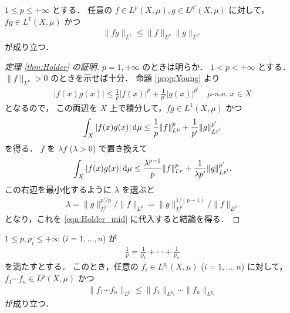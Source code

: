 \begin{theorem}\label{thm:Holder}
    $1\le p\le+\infty$ とする．
    任意の $f\in L^p(X,\mu),g\in L^{p'}(X,\mu)$ に対して，$fg\in L^1(X,\mu)$ かつ
    \begin{align*}
        \|fg\|_{L^1}\le\|f\|_{L^p}\|g\|_{L^{p'}}
    \end{align*}
    が成り立つ．
\end{theorem}

\begin{proof}[定理 \ref{thm:Holder} の証明]
    $p=1,+\infty$ のときは明らか．
    $1<p<+\infty$ とする．
    $\|f\|_{L^p}>0$ のときを示せば十分．
    命題 \ref{prop:Young} より
    \begin{align*}
        |f(x)g(x)|\le\frac{1}{p}|f(x)|^p+\frac{1}{p'}|g(x)|^{p'}\quad\textrm{$\mu$-a.e.\ $x\in X$}
    \end{align*}
    となるので，
    この両辺を $X$ 上で積分して，$fg\in L^1(X,\mu)$ かつ
    \begin{align*}
        \int_X|f(x)g(x)|\,\mathrm{d}\mu
        \le\frac{1}{p}\|f\|_{L^p}^p+\frac{1}{p'}\|g\|_{L^{p'}}^{p'}
    \end{align*}
    を得る．
    $f$ を $\lambda f$ ($\lambda>0$) で置き換えて
    \begin{align}
        \int_X|f(x)g(x)|\,\mathrm{d}\mu
        \le\frac{\lambda^{p-1}}{p}\|f\|_{L^p}^p+\frac{1}{\lambda p'}\|g\|_{L^{p'}}^{p'}.
        \label{eqn:Holder_mid}
    \end{align}
    この右辺を最小化するように $\lambda$ を選ぶと
    \begin{align*}
        \lambda
        =\|g\|_{L^{p'}}^{p'/p}/\|f\|_{L^p}
        =\|g\|_{L^{p'}}^{1/(p-1)}/\|f\|_{L^p}
    \end{align*}
    となり，これを \eqref{eqn:Holder_mid} に代入すると結論を得る．
\end{proof}

\begin{corollary}\label{cor:generalized_Holder}
    $1\le p,p_i\le+\infty$ ($i=1,\ldots,n$) が
    \begin{align*}
        \frac{1}{p}=\frac{1}{p_1}+\cdots+\frac{1}{p_n}
    \end{align*}
    を満たすとする．
    このとき，任意の $f_i\in L^{p_i}(X,\mu)$ ($i=1,\ldots,n$) に対して，$f_1\cdots f_n\in L^p(X,\mu)$ かつ
    \begin{align*}
        \|f_1\cdots f_n\|_{L^p}\le\|f_1\|_{L^{p_1}}\cdots\|f_n\|_{L^{p_n}}
    \end{align*}
    が成り立つ．
\end{corollary}

